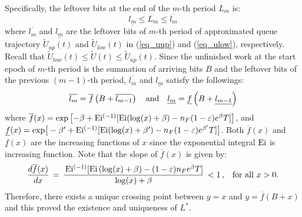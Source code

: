\documentclass[11pt,journal, onecolumn]{./IEEEtran}
\newcommand{\red}{\color{black}}
\begin{document}
{\red Specifically, the leftover bits at the end of the $m$-th period $L_m$ is:
\begin{equation}\label{eq17}
\underline {{l_m}}  \le {L_m} \le \overline {{l_m}}
\end{equation}
where $\overline {{l_m}}$ and $\underline {{l_m}}$ are the leftover bits of $m$-th period of approximated queue trajectory $\widetilde U_{up}(t)$ and  $\widetilde U_{low}(t)$ in (\ref{eq_uup}) and (\ref{eq_ulow}), respectively. Recall that $\widetilde U_{low}(t)\le\widetilde U(t) \le\widetilde U_{up}(t)$. Since the unfinished work at the start epoch of $m$-th period is the summation of arriving bits $B$ and the leftover bits of the previous $(m-1)$-th period, $\overline {{l_m}}$ and $\underline {{l_m}}$ satisfy the followings:
\[\overline {{l_m}}  = \overline f \left( {B + \overline {{l_{m - 1}}} } \right)\,\,\,\,\,\,{\rm{and}}\,\,\,\,\,\,\underline {{l_m}}  = \underline f \left( {B + \underline {{l_{m-1}}} } \right)\]
where $\overline f (x) = \exp \big[ { - \beta + {\rm{E}}{{\rm{i}}^{( - 1)}}[ {{\rm{Ei}}( {\log (x) + \beta} ) - { {n_F}(1 - \varepsilon )}{e^{\beta}}T} ]} \big]$, and $
\underline f (x) = \text{exp} \big[  - {\beta '} + {\rm{E}}{{\rm{i}}^{( - 1)}}[ {\rm{Ei}}( \log (x)+ {\beta '} ) - {{n_F}(1 - \varepsilon )} {e^{{\beta '}}}T ] \big]$.
Both $\overline f (x)$ and $\underline f (x)$ are the increasing functions of $x$ since the exponential integral $\rm{Ei}$ is increasing function.
Note that the slope of $\overline f(x)$ is given by:
\[\frac{{d\overline f(x)}}{{dx}}\, = \,\frac{{\,{\rm{E}}{{\rm{i}}^{( - 1)}}[{\rm{Ei}}\left( {\log (x) + \beta } \right) -  (1 - {\varepsilon}){n_F}{e^{\beta}}T]}}{{\log (x) + \beta  }}\, < 1\,,\,\,\,\,\,{\rm{for}}\,\,{\rm{all}}\,\,x>0.\]
Therefore, there exists a unique crossing point between $y=x$ and $y=\overline f(B+x)$ and this proved the existence and uniqueness of $L^*$. }
\end{document}
